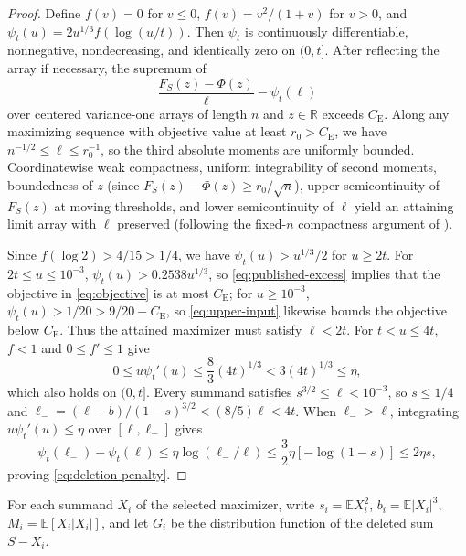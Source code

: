 \documentclass[11pt]{article}
\numberwithin{equation}{section}
\theoremstyle{remark}
\newcommand{\E}{\mathbb E}
\newcommand{\R}{\mathbb R}
\newcommand{\be}{C_{\mathrm E}}
\begin{document}
\begin{proof}
Define $f(v)=0$ for $v\le0$, $f(v)=v^2/(1+v)$ for $v>0$, and
$\psi_t(u)=2u^{1/3}f(\log(u/t))$. Then $\psi_t$ is continuously
differentiable, nonnegative, nondecreasing, and identically zero on $(0,t]$.
After reflecting the array if necessary, the supremum of
\begin{equation}\label{eq:objective}
              \frac{F_S(z)-\Phi(z)}{\ell}-\psi_t(\ell)
\end{equation}
over centered variance-one arrays of length $n$ and $z\in\R$ exceeds $\be$.
Along any maximizing sequence with objective value at least $r_0>\be$, we
have $n^{-1/2}\le\ell\le r_0^{-1}$, so the third absolute moments are
uniformly bounded. Coordinatewise weak compactness, uniform integrability of
second moments, boundedness of $z$ (since $F_S(z)-\Phi(z)\ge r_0/\sqrt n$),
upper semicontinuity of $F_S(z)$ at moving thresholds, and lower
semicontinuity of $\ell$ yield an attaining limit array with $\ell$ preserved
(following the fixed-$n$ compactness argument of \citet[Lemma~4.1]{HeCheng2026}).

Since $f(\log2)>4/15>1/4$, we have $\psi_t(u)>u^{1/3}/2$ for $u\ge2t$. For
$2t\le u\le10^{-3}$, $\psi_t(u)>0.2538u^{1/3}$, so \eqref{eq:published-excess}
implies that the objective in \eqref{eq:objective} is at most $\be$; for
$u\ge10^{-3}$, $\psi_t(u)>1/20>9/20-\be$, so \eqref{eq:upper-input} likewise
bounds the objective below $\be$. Thus the attained maximizer must satisfy
$\ell<2t$. For $t<u\le4t$, $f<1$ and $0\le f'\le1$ give
\[
 0\le u\psi_t'(u)\le\frac83(4t)^{1/3}
                         <3(4t)^{1/3}\le\eta,
\]
which also holds on $(0,t]$. Every summand satisfies $s^{3/2}\le\ell<10^{-3}$,
so $s\le1/4$ and $\ell_-=(\ell-b)/(1-s)^{3/2}<(8/5)\ell<4t$. When
$\ell_->\ell$, integrating $u\psi_t'(u)\le\eta$ over $[\ell,\ell_-]$ gives
\[
 \psi_t(\ell_-)-\psi_t(\ell)
 \le\eta\log(\ell_-/\ell)
 \le\frac32\eta[-\log(1-s)]\le2\eta s,
\]
proving \eqref{eq:deletion-penalty}.
\end{proof}

For each summand $X_i$ of the selected maximizer, write $s_i=\E X_i^2$,
$b_i=\E|X_i|^3$, $M_i=\E[X_i|X_i|]$, and let $G_i$ be the distribution
function of the deleted sum $S-X_i$.
\end{document}
